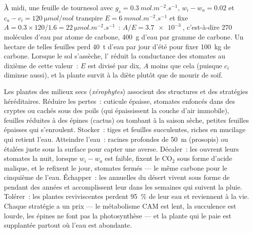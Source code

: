\begin{example}\label{ex:b2:plant-plasticity:wue}
À midi, une feuille de tournesol avec $g_s = \qty{0.3}{mol.m^{-2}.s^{-1}}$,
$w_i - w_a = 0.02$ et $c_a - c_i = \qty{120}{\micro mol/mol}$ transpire
$E = \qty{6}{mmol.m^{-2}.s^{-1}}$ et fixe $A =
0.3\times 120/1.6 = \qty{22}{\micro mol.m^{-2}.s^{-1}}$~: $A/E =
\qty{3.7e-3}{}$, c'est-à-dire 270 molécules d'eau par atome de carbone,
\qty{400}{g} d'eau par gramme de carbone. Un hectare de telles feuilles
perd \qty{40}{t} d'eau par jour d'été pour fixer \qty{100}{kg} de
carbone. Lorsque le sol s'assèche, l' réduit la
conductance des stomates au dixième de cette valeur~: $E$ est divisé par
dix, $A$ moins que cela (puisque $c_i$ diminue aussi), et la plante
survit à la diète plutôt que de mourir de soif.
\end{example}

\begin{proposition}\label{prop:b2:plant-plasticity:xerophytes}
Les plantes des milieux secs (\emph{xérophytes}) associent des
structures et des stratégies héréditaires. Réduire les pertes~: cuticule
épaisse, stomates enfoncés dans des cryptes ou cachés sous des poils (qui
épaississent la couche d'air immobile), feuilles réduites à des épines
(cactus) ou tombant à la saison sèche, petites feuilles épaisses qui
s'enroulent. Stocker~: tiges et feuilles succulentes, riches en mucilage
qui retient l'eau. Atteindre l'eau~: racines profondes de \qty{50}{m}
(prosopis) ou étalées juste sous la surface pour capter une averse.
Décaler~: les  ouvrent leurs stomates la nuit, lorsque
$w_i - w_a$ est faible, fixent le
$\mathrm{CO_2}$ sous forme d'acide malique, et le refixent le jour,
stomates fermés --- le même carbone pour le cinquième de l'eau.
Échapper~: les annuelles du désert vivent sous forme de  pendant
des années et accomplissent leur  dans les semaines qui
suivent la pluie. Tolérer~: les plantes reviviscentes perdent
\qty{95}{\%} de leur eau et reviennent à la vie. Chaque stratégie a un
prix --- le métabolisme CAM est lent, la succulence est lourde, les
épines ne font pas la photosynthèse --- et la plante qui le paie est
supplantée partout où l'eau est abondante.
\end{proposition}

